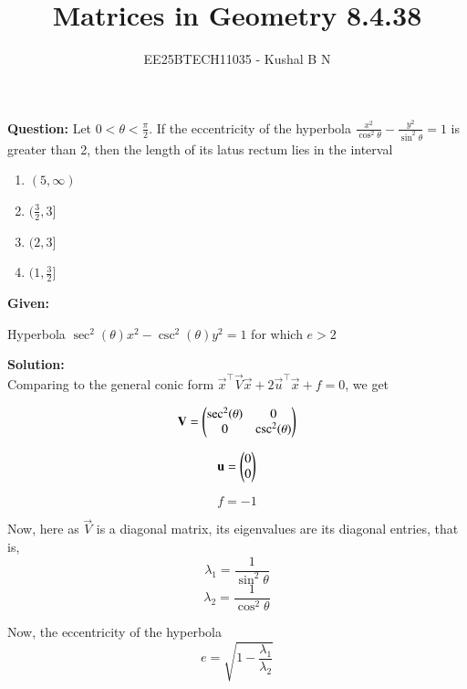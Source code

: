 \documentclass[journal,12pt,onecolumn]{IEEEtran}
\title{Matrices in Geometry 8.4.38}
\author{EE25BTECH11035 - Kushal B N}
\theoremstyle{remark}
\begin{document}
\vspace{3cm}
\maketitle
{\let\newpage\relax\maketitle}
\textbf{Question: }
Let $0 < \theta < \frac{\pi}{2}$. If the eccentricity of the hyperbola $\frac{x^2}{\cos^2{\theta}} - \frac{y^2}{\sin^2{\theta}} = 1$ is greater than 2, then the length of its latus rectum lies in the interval
\begin{enumerate}
    \item $(5,\infty)$
    \item $(\frac{3}{2},3 ]$
    \item $(2,3]$
    \item $(1,\frac{3}{2}]$
\end{enumerate}

\textbf{Given: }

Hyperbola $\sec^2(\theta)x^2 - \csc^2(\theta)y^2 = 1$ for which $e>2$

\textbf{Solution: }\\

Comparing to the general conic form $\vec{x}^{\top}\vec{V}\vec{x} + 2\vec{u}^{\top}\vec{x} + f = 0$, we get

\begin{equation}
    \mathbf{V} = \begin{pmatrix}\sec^2(\theta) & 0\\0 & \csc^2(\theta)\end{pmatrix}
\end{equation}

\begin{equation}
    \mathbf{u} = \begin{pmatrix}0\\0\end{pmatrix}
\end{equation}

\begin{equation}
    f = -1
\end{equation}

Now, here as $\vec{V}$ is a diagonal matrix, its eigenvalues are its diagonal entries, that is,
\begin{equation}
    \lambda_1 = \frac{1}{\sin^2{\theta}}
\end{equation}
\begin{equation}
    \lambda_2 = \frac{1}{\cos^2{\theta}}
\end{equation}

Now, the eccentricity of the hyperbola
\begin{equation}
    e = \sqrt{1 - \frac{\lambda_1}{\lambda_2}}
\end{equation}
\end{document}

